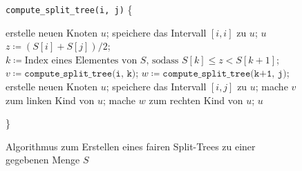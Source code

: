 \begin{figure}
	\centering
	\begin{minipage}{.8\linewidth}
		\begin{algorithmic}[H]
			\STATE \texttt{compute\_split\_tree(i, j)}  \{
			\begin{ALC@g}
					\STATE erstelle neuen Knoten $u$;
					\STATE speichere das Intervall $[i,i]$ zu $u$;
					\RETURN $u$
				\ELSE
					\STATE $z \coloneqq (S[i] + S[j]) / 2$;
					\STATE $k \coloneqq \text{Index eines Elementes von } S \text{, sodass } S[k] \leq z < S[k+1]$;
					\STATE $v \coloneqq \texttt{compute\_split\_tree(i, k)}$;
					\STATE $w \coloneqq \texttt{compute\_split\_tree(k+1, j)}$;
					\STATE erstelle neuen Knoten $u$;
					\STATE speichere das Intervall $[i, j]$ zu $u$;
					\STATE mache $v$ zum linken Kind von $u$;
					\STATE mache $w$ zum rechten Kind von $u$;
					\RETURN $u$
				\ENDIF
			\end{ALC@g}
			\STATE \}
		\end{algorithmic}
	\end{minipage}
	\caption{Algorithmus zum Erstellen eines fairen Split-Trees zu einer gegebenen Menge $S$}
	\label{fig:splittree}
\end{figure}

